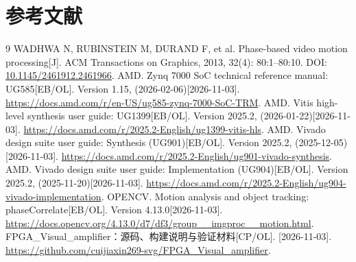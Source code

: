\documentclass[UTF8,a4paper,zihao=-4,fontset=none]{ctexart}
\numberwithin{figure}{section}
\numberwithin{table}{section}
\begin{document}
\section{参考文献}
\begingroup
{}
\renewcommand{\bibsection}{}
\begin{thebibliography}{9}
WADHWA N, RUBINSTEIN M, DURAND F, et al. Phase-based video motion processing[J]. ACM Transactions on Graphics, 2013, 32(4): 80:1--80:10. DOI: \href{https://doi.org/10.1145/2461912.2461966}{10.1145/2461912.2461966}.
AMD. Zynq 7000 SoC technical reference manual: UG585[EB/OL]. Version 1.15, (2026-02-06)[2026-11-03]. \url{https://docs.amd.com/r/en-US/ug585-zynq-7000-SoC-TRM}.
AMD. Vitis high-level synthesis user guide: UG1399[EB/OL]. Version 2025.2, (2026-01-22)[2026-11-03]. \url{https://docs.amd.com/r/2025.2-English/ug1399-vitis-hls}.
AMD. Vivado design suite user guide: Synthesis (UG901)[EB/OL]. Version 2025.2, (2025-12-05)[2026-11-03]. \url{https://docs.amd.com/r/2025.2-English/ug901-vivado-synthesis}.
AMD. Vivado design suite user guide: Implementation (UG904)[EB/OL]. Version 2025.2, (2025-11-20)[2026-11-03]. \url{https://docs.amd.com/r/2025.2-English/ug904-vivado-implementation}.
OPENCV. Motion analysis and object tracking: phaseCorrelate[EB/OL]. Version 4.13.0[2026-11-03]. \url{https://docs.opencv.org/4.13.0/d7/df3/group__imgproc__motion.html}.
FPGA\_Visual\_amplifier：源码、构建说明与验证材料[CP/OL]. [2026-11-03]. \url{https://github.com/cuijiaxin269-svg/FPGA_Visual_amplifier}.
\end{thebibliography}
\endgroup
\end{document}
